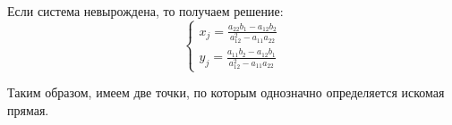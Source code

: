 Если система невырождена, то получаем решение:
$$\begin{cases}
	x_j = \frac{a_{22} b_1 - a_{12} b_2}{a_{12}^2 - a_{11}a_{22}} \\
	y_j = \frac{a_{11} b_2 - a_{12} b_1}{a_{12}^2 - a_{11}a_{22}}
\end{cases}$$

Таким образом, имеем две точки, по которым однозначно определяется искомая прямая.





